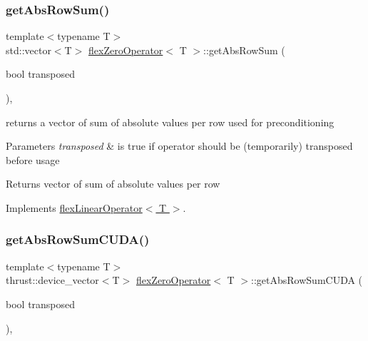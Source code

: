 \subsubsection{\texorpdfstring{get\+Abs\+Row\+Sum()}{getAbsRowSum()}}
{\footnotesize\ttfamily template$<$typename T$>$ \\
std\+::vector$<$T$>$ \hyperlink{classflex_zero_operator}{flex\+Zero\+Operator}$<$ T $>$\+::get\+Abs\+Row\+Sum (\begin{DoxyParamCaption}\item[{bool}]{transposed }\end{DoxyParamCaption})\hspace{0.3cm}{\ttfamily [inline]}, {\ttfamily [virtual]}}



returns a vector of sum of absolute values per row used for preconditioning 


\begin{DoxyParams}{Parameters}
{\em transposed} & is true if operator should be (temporarily) transposed before usage \\
\hline
\end{DoxyParams}
\begin{DoxyReturn}{Returns}
vector of sum of absolute values per row 
\end{DoxyReturn}


Implements \hyperlink{classflex_linear_operator_ad6caa7b09e6e3c401cadef61b8e2307e}{flex\+Linear\+Operator$<$ T $>$}.

\mbox{\label{classflex_zero_operator_ad63f43f4b1abe71779e5b0ee364b93d1}} 
\subsubsection{\texorpdfstring{get\+Abs\+Row\+Sum\+C\+U\+D\+A()}{getAbsRowSumCUDA()}}
{\footnotesize\ttfamily template$<$typename T$>$ \\
thrust\+::device\+\_\+vector$<$T$>$ \hyperlink{classflex_zero_operator}{flex\+Zero\+Operator}$<$ T $>$\+::get\+Abs\+Row\+Sum\+C\+U\+DA (\begin{DoxyParamCaption}\item[{bool}]{transposed }\end{DoxyParamCaption})\hspace{0.3cm}{\ttfamily [inline]}, {\ttfamily [virtual]}}



